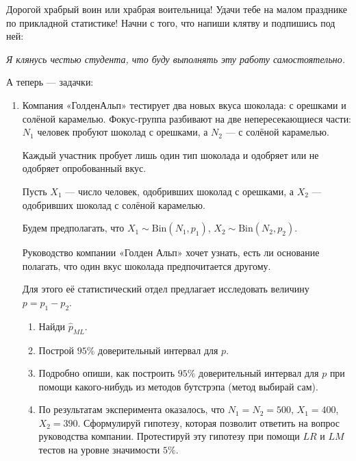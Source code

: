 \documentclass[12pt]{article}
\begin{document}
Дорогой храбрый воин или храбрая воительница! Удачи тебе на малом празднике по прикладной статистике!
Начни с того, что напиши клятву и подпишись под ней:

\vspace{10pt}
\textit{Я клянусь честью студента, что буду выполнять эту работу самостоятельно.}
\vspace{10pt}


А теперь — задачки:


\begin{enumerate}
\item 
   
   Компания «ГолденАльп» тестирует два новых вкуса шоколада: с орешками и солёной карамелью. 
   Фокус-группа разбивают на две непересекающиеся части: $N_1$ человек пробуют шоколад с орешками, 
   а $N_2$ — с солёной карамелью. 
   
   Каждый участник пробует лишь один тип шоколада и одобряет или не одобряет опробованный вкус.

   Пусть $X_1$ — число человек, одобривших шоколад с орешками, 
   а $X_2$ — одобривших шоколад с солёной карамелью. 
   
   Будем предполагать, что $X_1 \sim \mathrm{Bin}(N_1, p_1)$, $X_2 \sim \mathrm{Bin}(N_2, p_2)$.
   
   Руководство компании «Голден Альп» хочет узнать, есть ли основание полагать, 
   что один вкус шоколада предпочитается другому.

   Для этого её статистический отдел предлагает исследовать величину $p = p_1 - p_2$.
   
   \begin{enumerate}
   	\item Найди $\hat{p}_{ML}$.
   	\item Построй $95\%$ доверительный интервал для $p$.
   	\item Подробно опиши, как построить $95\%$ доверительный интервал для $p$ при помощи какого-нибудь из методов бутстрэпа (метод выбирай сам).
	   \item По результатам эксперимента оказалось, что $N_1 = N_2 = 500$, $X_1 = 400$, $X_2 = 390$. 
	   Сформулируй гипотезу, которая позволит ответить на вопрос руководства компании. 
	   Протестируй эту гипотезу при помощи $LR$ и $LM$ тестов на уровне значимости $5\%$.
   \end{enumerate}


\end{enumerate}
\end{document}
